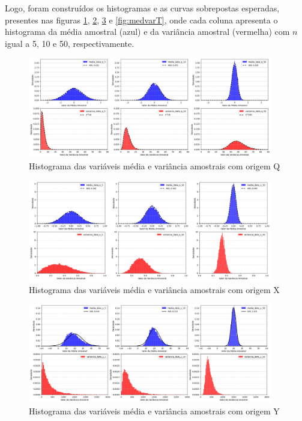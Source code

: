 \documentclass[]{abntex2}
\begin{document}
Logo, foram construídos os histogramas e as curvas sobrepostas esperadas, presentes nas figuras \ref{fig:medvarQ}, \ref{fig:medvarX}, \ref{fig:medvarY} e \ref{fig:medvarT}, onde cada coluna apresenta o histograma da média amostral (azul) e da variância amostral (vermelha) com $n$ igual a 5, 10 e 50, respectivamente.

\begin{figure}
    \centering 
    \includegraphics[width=0.95\textwidth]{imgs/medvarQ.png}
    \caption{Histograma das variáveis média e variância amostrais com origem Q}
    \label{fig:medvarQ} %
\end{figure}

\begin{figure}
    \centering 
    \includegraphics[width=0.95\textwidth]{imgs/medvarX.png}
    \caption{Histograma das variáveis média e variância amostrais com origem X}
    \label{fig:medvarX} %
\end{figure}

\begin{figure}
    \centering 
    \includegraphics[width=0.95\textwidth]{imgs/medvarY.png}
    \caption{Histograma das variáveis média e variância amostrais  com origem Y}
    \label{fig:medvarY} %
\end{figure}
\end{document}
